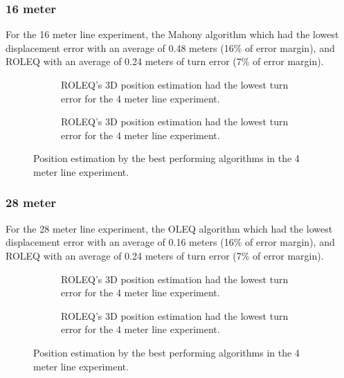 \subsubsection{16 meter}
For the 16 meter line experiment, the Mahony algorithm which had the lowest displacement error with an average of 0.48 meters (16\% of error margin), and ROLEQ with an average of 0.24 meters of turn error (7\% of error margin).

\begin{figure}[!h]
    \centering
    
\end{figure}

\begin{figure}[!h]
    \centering
    \begin{subfigure}{0.49\textwidth}
        \centering
        \resizebox{1\linewidth}{!}{}
        \caption{ ROLEQ's 3D position estimation had the lowest turn error for the 4 meter line experiment. }
        \label{fig:line16_2D}
    \end{subfigure}
    \begin{subfigure}{0.49\textwidth}
        \centering
        \resizebox{1\linewidth}{!}{}
        \caption{ROLEQ's 3D position estimation had the lowest turn error for the 4 meter line experiment.}
        \label{fig:line16_3D}
    \end{subfigure}
    \caption{Position estimation by the best performing algorithms in the 4 meter line experiment.}
    \label{fig:line16}
\end{figure}

\subsubsection{28 meter}

For the 28 meter line experiment, the OLEQ algorithm which had the lowest displacement error with an average of 0.16 meters (16\% of error margin), and ROLEQ with an average of 0.24 meters of turn error (7\% of error margin).

\begin{figure}[!h]
    \centering
    
\end{figure}

\begin{figure}[!h]
    \centering
    \begin{subfigure}{0.49\textwidth}
        \centering
        \resizebox{1\linewidth}{!}{}
        \caption{ROLEQ's 3D position estimation had the lowest turn error for the 4 meter line experiment.}
        \label{fig:line28_2D}
    \end{subfigure}
    \begin{subfigure}{0.49\textwidth}
        \centering
        \resizebox{1\linewidth}{!}{}
        \caption{ROLEQ's 3D position estimation had the lowest turn error for the 4 meter line experiment.}
        \label{fig:line28_3D}
    \end{subfigure}
    \caption{Position estimation by the best performing algorithms in the 4 meter line experiment.}
    \label{fig:line28}
\end{figure}

